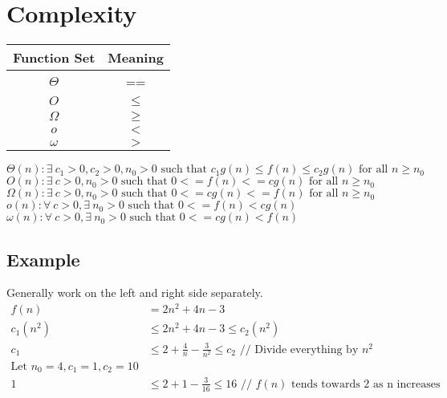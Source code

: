 \documentclass{article}
\begin{document}
\section{Complexity}

\begin{table}[H]
    \begin{tabular}{|c|c|}
    \hline
        \textbf{Function Set} & \textbf{Meaning} \\
    \hline
        \(\Theta\) & == \\
    \hline
        \(O\) & \(\leq\) \\
    \hline
        \(\Omega\) & \(\geq\) \\
    \hline
        \(o\) & \(<\) \\
    \hline
        \(\omega\) & \(>\) \\
    \hline
    \end{tabular}
\end{table}

\(\Theta(n): \exists \medspace c_1 > 0, c_2 > 0, n_0 > 0 \text{ such that } c_1g(n) \leq f(n) \leq c_2g(n) \text{ for all } n \geq n_0\) \\
\(O(n): \exists \medspace c > 0, n_0 > 0 \text{ such that } 0 <= f(n) <= cg(n) \text{ for all } n \geq n_0 \) \\
\(\Omega(n): \exists \medspace c > 0, n_0 > 0 \text{ such that } 0 <= cg(n) <= f(n) \text{ for all } n \geq n_0 \) \\
\(o(n): \forall \medspace c > 0, \exists \medspace n_0 > 0 \text{ such that } 0 <= f(n) < cg(n) \) \\
\(\omega(n): \forall \medspace c > 0, \exists \medspace n_0 > 0 \text{ such that } 0 <= cg(n) < f(n) \) \\

\subsection{Example}
Generally work on the left and right side separately.
\begin{align*}
    f(n) &= 2n^2 + 4n - 3 \\
    c_1(n^2) &\leq 2n^2 + 4n - 3 \leq c_2(n^2) \\
    c_1 &\leq 2 + \frac{4}{n} - \frac{3}{n^2} \leq c_2 \text { // Divide everything by } n^2 \\
    \text{Let } n_0 = 4, c_1 = 1, c_2 = 10 \\
    1 &\leq 2 + 1 - \frac{3}{16} \leq 16 \text{ // } f(n) \text{ tends towards 2 as n increases} \\
\end{align*}
\end{document}
